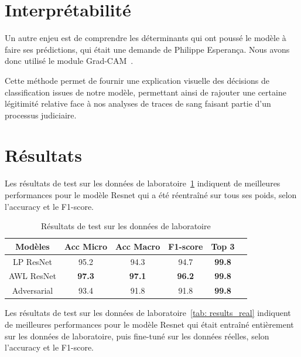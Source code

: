 \documentclass[a4paper]{article}
\begin{document}
\section{Interprétabilité}

Un autre enjeu est de comprendre les déterminants qui ont poussé le modèle à faire ses prédictions, qui était une demande de Philippe Esperança. Nous avons donc utilisé le module Grad-CAM~\cite{GRADCAM}. 

Cette méthode permet de fournir une explication visuelle des décisions de classification issues de notre modèle, permettant ainsi de rajouter une certaine légitimité relative face à nos analyses de traces de sang faisant partie d'un processus judiciaire. 



\section{Résultats}

Les résultats de test sur les données de laboratoire~\ref{tab:results_lab} indiquent de meilleures performances pour le modèle Resnet qui a été réentraîné sur tous ses poids, selon l'accuracy et le F1-score. 

\begin{table}[ht]
  \centering
    \begin{tabular}{cccccc}
    \toprule
    Modèles & Acc Micro & Acc Macro & F1-score & Top 3 \\
    \midrule
    LP ResNet & 95.2 & 94.3 & 94.7 & \textbf{99.8} \\
    AWL ResNet & \textbf{97.3} & \textbf{97.1} & \textbf{96.2} & \textbf{99.8} \\
    Adversarial & 93.4 & 91.8 & 91.8 & \textbf{99.8} \\
    \bottomrule
    \end{tabular}
  \label{tab:results_lab}
  \caption{Résultats de test sur les données de laboratoire}
\end{table}

Les résultats de test sur les données de laboratoire~\ref{tab: results_real} indiquent de meilleures performances pour le modèle Resnet qui était entraîné entièrement sur les données de laboratoire, puis fine-tuné sur les données réelles, selon l'accuracy et le F1-score. 
\end{document}
